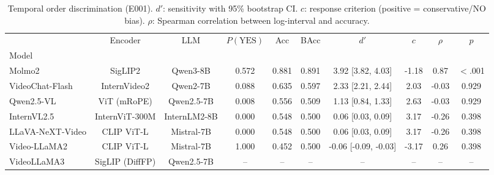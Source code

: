 \begin{table}[t]
\centering
\small
\caption{Temporal order discrimination (E001). $d'$: sensitivity with 95\% bootstrap CI. $c$: response criterion (positive = conservative/NO bias). $\rho$: Spearman correlation between log-interval and accuracy.}
\label{tab:main}
\begin{tabular}{lccccccccc}
\toprule
 & Encoder & LLM & $P(\text{YES})$ & Acc & BAcc & $d'$ & $c$ & $\rho$ & $p$ \\
Model &  &  &  &  &  &  &  &  &  \\
\midrule
Molmo2 & SigLIP2 & Qwen3-8B & 0.572 & 0.881 & 0.891 & 3.92 [3.82, 4.03] & -1.18 & 0.87 & $<$.001 \\
VideoChat-Flash & InternVideo2 & Qwen2-7B & 0.088 & 0.635 & 0.597 & 2.33 [2.21, 2.44] & 2.03 & -0.03 & 0.929 \\
Qwen2.5-VL & ViT (mRoPE) & Qwen2.5-7B & 0.008 & 0.556 & 0.509 & 1.13 [0.84, 1.33] & 2.63 & -0.03 & 0.929 \\
InternVL2.5 & InternViT-300M & InternLM2-8B & 0.000 & 0.548 & 0.500 & 0.06 [0.03, 0.09] & 3.17 & -0.26 & 0.398 \\
LLaVA-NeXT-Video & CLIP ViT-L & Mistral-7B & 0.000 & 0.548 & 0.500 & 0.06 [0.03, 0.09] & 3.17 & -0.26 & 0.398 \\
Video-LLaMA2 & CLIP ViT-L & Mistral-7B & 1.000 & 0.452 & 0.500 & -0.06 [-0.09, -0.03] & -3.17 & 0.26 & 0.398 \\
VideoLLaMA3 & SigLIP (DiffFP) & Qwen2.5-7B & -- & -- & -- & -- & -- & -- & -- \\
\bottomrule
\end{tabular}
\end{table}
